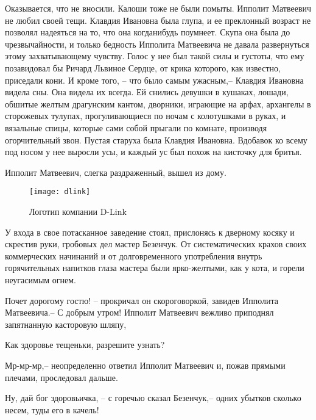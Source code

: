 \begin{itemizePaper}
    Оказывается, что не вносили. Калоши тоже не были помыты. Ипполит Матвеевич не любил своей тещи. Клавдия Ивановна была глупа,
    и ее преклонный возраст не позволял надеяться на то, что она когданибудь поумнеет.
    Скупа она была до чрезвычайности, и только бедность Ипполита Матвеевича не давала развернуться этому захватывающему чувству.
    Голос у нее был такой силы и густоты, что ему позавидовал бы Ричард Львиное Сердце, от крика которого, как известно, приседали кони.
    И кроме того, -- что было самым ужасным,-- Клавдия Ивановна видела сны. Она видела их всегда.
    Ей снились девушки в кушаках, лошади, обшитые желтым драгунским кантом, дворники, играющие на арфах,
    архангелы в сторожевых тулупах, прогуливающиеся по ночам с колотушками в руках, и вязальные спицы,
    которые сами собой прыгали по комнате, производя огорчительный звон. Пустая старуха была Клавдия Ивановна.
    Вдобавок ко всему под носом у нее выросли усы, и каждый ус был похож на кисточку для бритья.
\end{itemizePaper}

Ипполит Матвеевич, слегка раздраженный, вышел из дому.

\begin{figure}[ht]
    \centerfloat
    {
        \texttt{[image: dlink]}
    }
    \caption{Логотип компании D-Link}\label{fig:dlink}
\end{figure}

У входа в свое потасканное заведение стоял,
прислонясь к дверному косяку и скрестив руки, гробовых дел мастер Безенчук.
От систематических крахов своих коммерческих начинаний и от долговременного употребления внутрь горячительных
напитков глаза мастера были ярко-желтыми, как у кота, и горели неугасимым огнем.

\begin{itemizePaper}
    \item Почет дорогому гостю!\cite{aero_mission} -- прокричал\cite{foresight} он скороговоркой, завидев\cite{Lai202244} Ипполита Матвеевича.-- С добрым утром!
    Ипполит Матвеевич вежливо приподнял запятнанную касторовую шляпу\cite{huawei1},
    \item Как здоровье тещеньки, разрешите\cite{Shu2022} узнать?
    \item Мр-мр-мр,-- неопределенно\cite{agro} ответил Ипполит\cite{agrointro} Матвеевич и, пожав прямыми\cite{archindia} плечами, проследовал дальше.
    \item Ну, дай бог здоровьичка, -- с горечью сказал Безенчук,-- одних убытков\cite{juniper} сколько несем, туды его в качель!
\end{itemizePaper}



